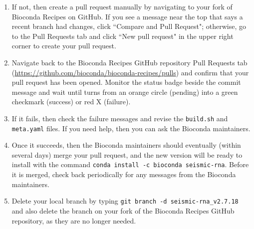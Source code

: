 \documentclass[main.tex]{subfiles}
\begin{document}
\begin{enumerate}
    \item If not, then create a pull request manually by navigating to your fork of Bioconda Recipes on GitHub. If you see a message near the top that says a recent branch had changes, click ``Compare and Pull Request"; otherwise, go to the Pull Requests tab and click ``New pull request" in the upper right corner to create your pull request.
    \item Navigate back to the Bioconda Recipes GitHub repository Pull Requests tab (\url{https://github.com/bioconda/bioconda-recipes/pulls}) and confirm that your pull request has been opened. Monitor the status badge beside the commit message and wait until turns from an orange circle (pending) into a green checkmark (success) or red X (failure).
    \item If it fails, then check the failure messages and revise the \verb|build.sh| and \verb|meta.yaml| files. If you need help, then you can ask the Bioconda maintainers.
    \item Once it succeeds, then the Bioconda maintainers should eventually (within several days) merge your pull request, and the new version will be ready to install with the command \verb|conda install -c bioconda seismic-rna|. Before it is merged, check back periodically for any messages from the Bioconda maintainers.
    \item Delete your local branch by typing \verb|git branch -d seismic-rna_v2.7.18| and also delete the branch on your fork of the Bioconda Recipes GitHub repository, as they are no longer needed.
        
\end{enumerate}
\end{document}
